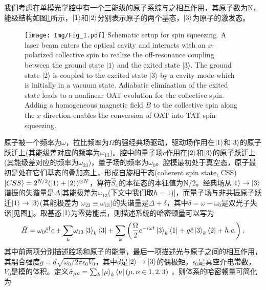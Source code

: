 我们考虑在单模光学腔中有一个三能级的原子系综与之相互作用，其原子数为N，能级结构如图\ref{figure7}所示，$\ket{1}$和$\ket{2}$分别表示原子的两个基态，$\ket{3}$为原子的激发态。
\begin{figure}[htbp]
	\centering
	\texttt{[image: Img/Fig\_1.pdf]}
	{Schematic setup for spin squeezing. A laser beam enters the optical cavity and interacts with an $x$-polarized collective spin to realize the off-resonance coupling between the ground state $|1\rangle$ and the exited state $|3\rangle$. The ground state $|2\rangle$ is coupled to the excited state $|3\rangle$ by a cavity mode which is initially in a vacuum state. Adiabatic elimination of the exited state leads to a nonlinear OAT evolution for the collective spin. Adding a homogeneous magnetic field $B$ to the collective spin along the $x$ direction enables the conversion of OAT into TAT spin squeezing.}
	\label{figure7}
\end{figure}
原子被一个频率为$\omega$，拉比频率为$\Omega$的强经典场驱动，驱动场作用在$\ket{1}$和$\ket{3}$的原子跃迁上(其能级差对应的频率为$\omega_{13}$)。腔中的量子场$c$作用在$\ket{2}$和$\ket{3}$的原子跃迁上(其能级差对应的频率为$\omega_{23}$)，量子场的频率为$\omega_0$。腔模最初处于真空态，原子最初是处在它们基态的叠加态上，形成自旋相干态(coherent spin state, CSS)$\ket{CSS}=2^{N/2}(\ket{1}+\ket 2)^{\otimes N}$，算符$\hat{S}_x$的本征态的本征值为N/2。经典场从$\ket 1\to\ket 3$谐振的失谐量是$\Delta$[其能极差为$\omega_{13}$(下文中我们取$\hbar=1$)]，而量子场与非共振原子跃迁$\ket 1\to\ket 3$(其能极差为 ${\omega _{23}} \equiv {\omega _{13}}$)的失谐量是$\Delta+\delta$，其中$\delta=\omega-\omega_0$是双光子失谐[见图\ref{figure7}]。取基态$\ket{1}$为零势能点，则描述系统的哈密顿量可以写为
\begin{align}
\hat H = {\omega _0}{\hat c^\dag }c + {\sum _k}{\omega _{13}}\ket{3}_k\bra{3}+ {\sum _k}\left( {\frac{\Omega }{2}{e^{ - i\omega t}}\ket{3}_k\bra{1} + g\hat c\ket{3}_k\bra{2} + h.c.} \right),\label{eq441}
\end{align}
其中前两项分别描述腔场和原子的能量，最后一项描述光与原子之间的相互作用，其耦合强度$g=d\sqrt{\omega_0/2\pi\epsilon_0V_0}$，其中$d$是$\ket 2\to\ket 3$的偶极矩，$\epsilon_0$是真空介电常数，$V_0$是模的体积。定义$\hat{\sigma}_{\mu\nu}=\sum_k\ket{\mu}_k\bra{\nu}(\mu,\nu\in{1,2,3})$ ，则体系的哈密顿量可简化为
